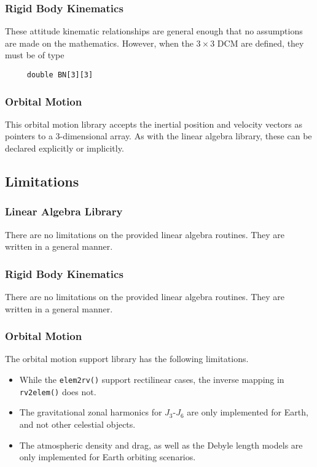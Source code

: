 \subsubsection{Rigid Body Kinematics}
These attitude kinematic relationships are general enough that no assumptions are made on the mathematics.  However, when the $3\times 3$ DCM are defined, they must be of type
\begin{verbatim}
     double BN[3][3]
\end{verbatim}


\subsubsection{Orbital Motion}
This orbital motion library accepts the inertial position and velocity vectors as pointers to a 3-dimensional array.  As with the linear algebra library, these can be declared explicitly or implicitly.    


\subsection{Limitations}
\subsubsection{Linear Algebra Library}
There are no limitations on the provided linear algebra routines.  They are written in a general manner. 

\subsubsection{Rigid Body Kinematics}
There are no limitations on the provided linear algebra routines.  They are written in a general manner.  

\subsubsection{Orbital Motion}
The orbital motion support library has the following limitations.
\begin{itemize}
	\item While the {\tt elem2rv()} support rectilinear cases, the inverse mapping in {\tt rv2elem()} does not.
	\item The gravitational zonal harmonics for $J_{3}$-$J_{6}$ are only implemented for Earth, and not other celestial objects.
	\item The atmospheric density and drag, as well as the Debyle length models are only implemented for Earth orbiting scenarios. 
\end{itemize}













